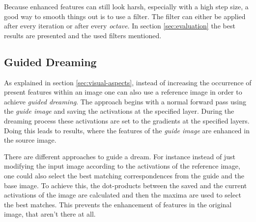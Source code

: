 Because enhanced features can still look harsh, especially with a high step size, a good way to smooth things out is to use a filter. 
The filter can either be applied after every iteration or after every \textit{octave}.
In section \ref{sec:evaluation} the best results are presented and the used filters mentioned.

\newpage
\subsection{Guided Dreaming}
\label{guided-dreaming}
As explained in section \ref{sec:visual-aspects}, instead of increasing the occurrence of present features within an image one can also use a reference image in order to achieve \emph{guided dreaming}.
The approach begins with a normal forward pass using the \emph{guide image} and saving the activations at the specified layer.
During the dreaming process these activations are set to the gradients at the specified layers.
Doing this leads to results, where the features of the \emph{guide image} are enhanced in the source image.


There are different approaches to guide a dream.
For instance instead of just modifying the input image according to the activations of the reference image, one could also select the best matching correspondences from the guide and the base image.
To achieve this, the dot-products between the saved and the current activations of the image are calculated and then the maxima are used to select the best matches.
This prevents the enhancement of  features in the original image, that aren't there at all.\cite{deep-dream-github}


